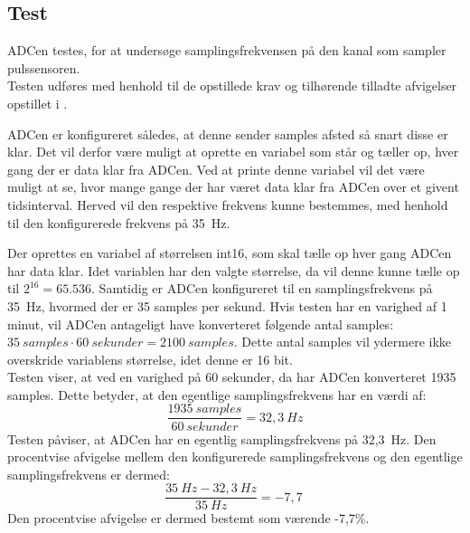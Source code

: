 \subsection{Test}
ADCen testes, for at undersøge samplingsfrekvensen på den kanal som sampler pulssensoren. \\
Testen udføres med henhold til de opstillede krav og tilhørende tilladte afvigelser opstillet i .

ADCen er konfigureret således, at denne sender samples afsted så snart disse er klar. Det vil derfor være muligt at oprette en variabel som står og tæller op, hver gang der er data klar fra ADCen. Ved at printe denne variabel vil det være muligt at se, hvor mange gange der har været data klar fra ADCen over et givent tidsinterval. Herved vil den respektive frekvens kunne bestemmes, med henhold til den konfigurerede frekvens på 35~Hz. 

Der oprettes en variabel af størrelsen int16, som skal tælle op hver gang ADCen har data klar. Idet variablen har den valgte størrelse, da vil denne kunne tælle op til $2^16 = 65.536$. Samtidig er ADCen konfigureret til en samplingsfrekvens på 35~Hz, hvormed der er 35 samples per sekund. Hvis testen har en varighed af 1 minut, vil ADCen antageligt have konverteret følgende antal samples: $35~samples \cdot 60~sekunder = 2100~samples$. Dette antal samples vil ydermere ikke overskride variablens størrelse, idet denne er 16 bit. \\
Testen viser, at ved en varighed på 60 sekunder, da har ADCen konverteret 1935 samples. Dette betyder, at den egentlige samplingsfrekvens har en værdi af:
\begin{equation}
\frac{1935~samples}{60~sekunder} = 32,3~Hz 
\end{equation}
Testen påviser, at ADCen har en egentlig samplingsfrekvens på 32,3~Hz. Den procentvise afvigelse mellem den konfigurerede samplingsfrekvens og den egentlige samplingsfrekvens er dermed:
\begin{equation}
\frac{35~Hz-32,3~Hz}{35~Hz} = -7,7~%
\end{equation}
Den procentvise afvigelse er dermed bestemt som værende -7,7\%. 
